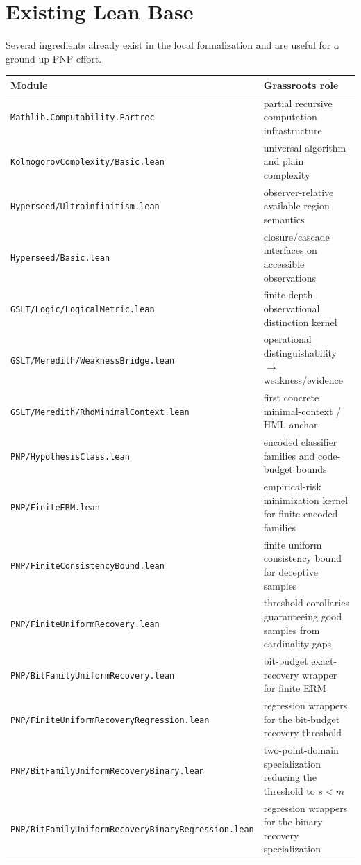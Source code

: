 \documentclass[11pt]{article}
\theoremstyle{remark}
\begin{document}
\section{Existing Lean Base}

Several ingredients already exist in the local formalization and are useful for a
ground-up PNP effort.

\begin{center}
\begin{tabular}{ll}
\toprule
\textbf{Module} & \textbf{Grassroots role} \\
\midrule
\texttt{Mathlib.Computability.Partrec} & partial recursive computation infrastructure \\
\texttt{KolmogorovComplexity/Basic.lean} & universal algorithm and plain complexity \\
\texttt{Hyperseed/Ultrainfinitism.lean} & observer-relative available-region semantics \\
\texttt{Hyperseed/Basic.lean} & closure/cascade interfaces on accessible observations \\
\texttt{GSLT/Logic/LogicalMetric.lean} & finite-depth observational distinction kernel \\
\texttt{GSLT/Meredith/WeaknessBridge.lean} & operational distinguishability $\to$ weakness/evidence \\
\texttt{GSLT/Meredith/RhoMinimalContext.lean} & first concrete minimal-context / HML anchor \\
\texttt{PNP/HypothesisClass.lean} & encoded classifier families and code-budget bounds \\
\texttt{PNP/FiniteERM.lean} & empirical-risk minimization kernel for finite encoded families \\
\texttt{PNP/FiniteConsistencyBound.lean} & finite uniform consistency bound for deceptive samples \\
\texttt{PNP/FiniteUniformRecovery.lean} & threshold corollaries guaranteeing good samples from cardinality gaps \\
\texttt{PNP/BitFamilyUniformRecovery.lean} & bit-budget exact-recovery wrapper for finite ERM \\
\texttt{PNP/FiniteUniformRecoveryRegression.lean} & regression wrappers for the bit-budget recovery threshold \\
\texttt{PNP/BitFamilyUniformRecoveryBinary.lean} & two-point-domain specialization reducing the threshold to \(s<m\) \\
\texttt{PNP/BitFamilyUniformRecoveryBinaryRegression.lean} & regression wrappers for the binary recovery specialization \\

\end{tabular}
\end{center}
\end{document}
